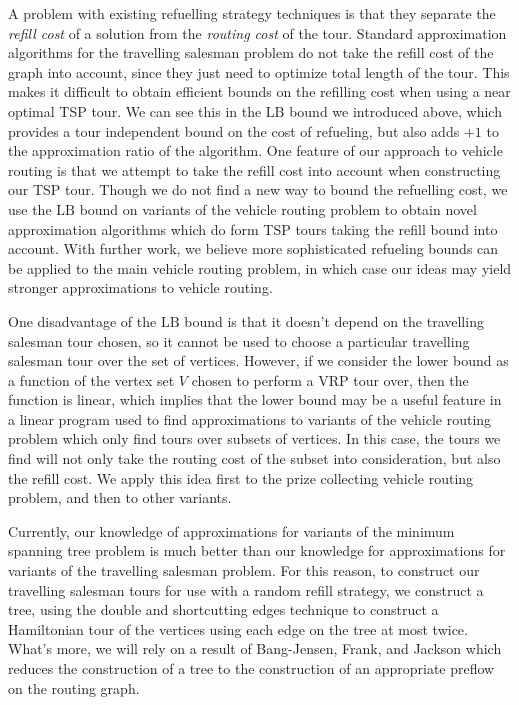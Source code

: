 \documentclass{article}
\theoremstyle{plain}
\begin{document}
A problem with existing refuelling strategy techniques is that they separate the {\it refill cost} of a solution from the {\it routing cost} of the tour. Standard approximation algorithms for the travelling salesman problem do not take the refill cost of the graph into account, since they just need to optimize total length of the tour. This makes it difficult to obtain efficient bounds on the refilling cost when using a near optimal TSP tour. We can see this in the $\text{LB}$ bound we introduced above, which provides a tour independent bound on the cost of refueling, but also adds $+1$ to the approximation ratio of the algorithm. One feature of our approach to vehicle routing is that we attempt to take the refill cost into account when constructing our TSP tour. Though we do not find a new way to bound the refuelling cost, we use the $\text{LB}$ bound on variants of the vehicle routing problem to obtain novel approximation algorithms which do form TSP tours taking the refill bound into account. With further work, we believe more sophisticated refueling bounds can be applied to the main vehicle routing problem, in which case our ideas may yield stronger approximations to vehicle routing.

One disadvantage of the $\text{LB}$ bound is that it doesn't depend on the travelling salesman tour chosen, so it cannot be used to choose a particular travelling salesman tour over the set of vertices. However, if we consider the lower bound as a function of the vertex set $V$ chosen to perform a VRP tour over, then the function is linear, which implies that the lower bound may be a useful feature in a linear program used to find approximations to variants of the vehicle routing problem which only find tours over subsets of vertices. In this case, the tours we find will not only take the routing cost of the subset into consideration, but also the refill cost. We apply this idea first to the prize collecting vehicle routing problem, and then to other variants.

Currently, our knowledge of approximations for variants of the minimum spanning tree problem is much better than our knowledge for approximations for variants of the travelling salesman problem. For this reason, to construct our travelling salesman tours for use with a random refill strategy, we construct a tree, using the double and shortcutting edges technique to construct a Hamiltonian tour of the vertices using each edge on the tree at most twice. What's more, we will rely on a result of Bang-Jensen, Frank, and Jackson which reduces the construction of a tree to the construction of an appropriate preflow on the routing graph.
\end{document}
